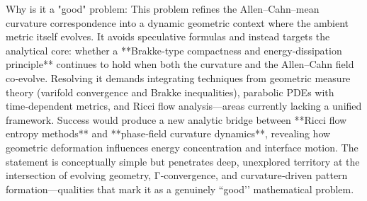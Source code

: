 Why is it a "good" problem:  
This problem refines the Allen–Cahn–mean curvature correspondence into a dynamic geometric context where the ambient metric itself evolves.  It avoids speculative formulas and instead targets the analytical core: whether a **Brakke‑type compactness and energy‑dissipation principle** continues to hold when both the curvature and the Allen–Cahn field co‑evolve.  
Resolving it demands integrating techniques from geometric measure theory (varifold convergence and Brakke inequalities), parabolic PDEs with time‑dependent metrics, and Ricci flow analysis—areas currently lacking a unified framework.  
Success would produce a new analytic bridge between **Ricci flow entropy methods** and **phase‑field curvature dynamics**, revealing how geometric deformation influences energy concentration and interface motion.  
The statement is conceptually simple but penetrates deep, unexplored territory at the intersection of evolving geometry, Γ‑convergence, and curvature‑driven pattern formation—qualities that mark it as a genuinely “good’’ mathematical problem.